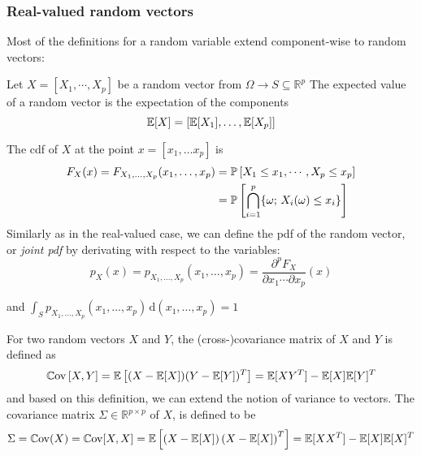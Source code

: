 \documentclass[../../Main_ManuscritThese.tex]{subfiles}
\begin{document}
\subsubsection{Real-valued random vectors}
 Most of the definitions for a random variable extend component-wise to random vectors:

\begin{definition}
 \label{def:joint_marginal_cond_densities}
 Let $X=[X_1,\cdots,X_p]$ be a random vector from $\Omega \rightarrow S\subseteq\mathbb{R}^p$
 The expected value of a random vector is the expectation of the components
 \begin{equation}
\mathbb{E}[X] = \left[\mathbb{E}[X_1],\dots,\mathbb{E}[X_p]\right]
\end{equation}

The cdf of $X$ at the point $x=[x_1,\dots x_p]$ is
   \begin{align}
     \label{eq:def_cdf_multi}
     F_{X}(x) = F_{X_1,\dots, X_p}(x_1,\dots, x_p) &= \mathbb{P}\left[X_1 \leq x_1, \cdots, X_p\leq x_p\right]\\
                                                   &= \mathbb{P}\left[\bigcap_{i=1}^p \{\omega;\,X_i(\omega) \leq x_i\}\right] \nonumber
  \end{align}
 Similarly as in the real-valued case, we can define the pdf of the random vector, or \emph{joint pdf} by derivating with respect to the variables:
  \begin{equation}
    p_{X}(x)= p_{X_1,\dots, X_p}(x_1,\dots, x_p) =\frac{\partial^p F_X}{\partial x_1 \cdots \partial x_p}(x)
  \end{equation}
  
  and $\int_{S}p_{X_1,\dots, X_p}(x_1,\dots, x_p)\,\mathrm{d}(x_1,\dots, x_p)=1$

For two random vectors $X$ and $Y$, the (cross-)covariance matrix of $X$ and $Y$ is defined as  
  \begin{equation}
    \mathbb{C}\mathrm{ov}\left[X,Y\right] = \mathbb{E}\left[(X-\mathbb{E}[X])(Y - \mathbb{E}[Y])^T\right] = \mathbb{E}[XY^T] - \mathbb{E}[X]\mathbb{E}[Y]^T
  \end{equation}
and based on this definition, we can extend the notion of variance to vectors. The covariance matrix $\Sigma \in \mathbb{R}^{p\times p}$ of $X$, is defined to be
  \begin{equation}
    \Sigma = \mathbb{C}\mathrm{ov}(X)=\mathbb{C}\mathrm{ov}[X,X]= \mathbb{E}\left[\left(X - \mathbb{E}[X]\right)\left(X-\mathbb{E}[X]\right)^T\right] = \mathbb{E}[XX^T] - \mathbb{E}[X]\mathbb{E}[X]^T
  \end{equation}



\end{definition}
\end{document}
